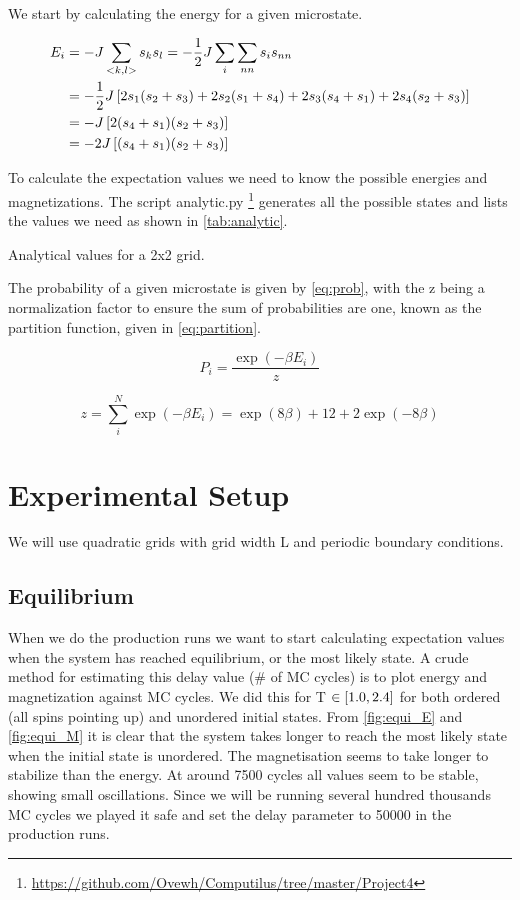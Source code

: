 We start by calculating the energy for a given microstate.

\begin{align*}
  E_i &= -J \sum_{<k,l>} s_k s_l = -\frac{1}{2}J \sum_{i} \sum_{nn} s_i s_{nn} \\
      &= -\frac{1}{2} J \left[2 s_1 (s_2 + s_3) + 2s_2(s_1 + s_4) + 2s_3(s_4 + s_1) + 2s_4 (s_2 + s_3)\right]\\
      &= -J\left[ 2(s_4 + s_1)(s_2 + s_3)\right] \\
      &= -2J\left[(s_4 + s_1)(s_2+s_3)\right]
\end{align*}

To calculate the expectation values we need to know the possible energies and
magnetizations. The script analytic.py \footnote{\url{https://github.com/Ovewh/Computilus/tree/master/Project4}}  generates all the
possible states and lists the values we need as shown in \cref{tab:analytic}.

\begin{table}[htp]
  \centering
  \caption{Analytical values for a 2x2 grid.}
  \label{tab:analytic}
\end{table}

The probability of a given microstate is given by \cref{eq:prob}, with
the z being a normalization factor to ensure the sum of probabilities are one,
known as the partition function, given in \cref{eq:partition}.


\begin{equation}
  \label{eq:prob}
  P_i = \frac{\exp(-\beta E_i)}{z}
\end{equation}

\begin{equation}
  \label{eq:partition}
  z = \sum_{i}^{N} \exp(-\beta E_i) = \exp(8\beta) + 12 + 2\exp(-8\beta)
\end{equation}


\section{Experimental Setup}
We will
use quadratic grids with grid width L and periodic
boundary conditions.


\subsection{Equilibrium}

When we do the production runs we want to start calculating expectation values
when the system has reached equilibrium, or the most likely state. A crude
method for estimating this delay value (\# of MC cycles) is to plot energy and
magnetization against MC cycles. We did this for T $\in \left[1.0,2.4\right]$ for both
ordered (all spins pointing up) and unordered initial states. From
\cref{fig:equi_E} and \cref{fig:equi_M} it is clear that the system takes longer
to reach the most likely state when the initial state is unordered. The
magnetisation seems to take longer to stabilize than the energy. At around 7500
cycles all values seem to be stable, showing small oscillations. Since we will
be running several hundred thousands MC cycles we played it safe and set the
delay parameter to 50000 in the production runs.

